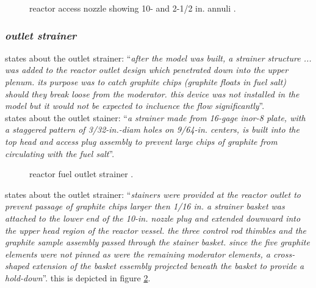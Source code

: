 \documentclass[ms,a4paper]{memoir}
\newcommand*{\mrsarchive}{../../msr-archive}%
\begin{document}
\begin{figure}[H]
  \centering
  \centering
  \caption{reactor access nozzle showing 10- and 2-1/2 in. annuli  \parencite[figure 5.10]{ornl-tm-3229}.}
  \label{3039-fig5-10}
\end{figure}

\subsubsection{\emph{outlet strainer}}
\textcite[page 24-26]{ornl-tm-3229} states about the outlet strainer:
\enquote{\textit{after the model was built, a strainer structure ... was added to the reactor outlet design which penetrated down into the upper plenum. its purpose was to catch graphite chips (graphite floats in fuel salt) should they break loose from the moderator. this device was not installed in the model but it would not be expected to incluence the flow significantly}}. \\

\parencite[page 84-85]{ornl-tm-0728} states about the outlet stainer:
\enquote{\textit{a strainer made from 16-gage inor-8 plate, with a staggered pattern of 3/32-in.-diam holes on 9/64-in. centers, is built into the top head and access plug assembly to prevent large chips of graphite from circulating with the fuel salt}}.

\begin{figure}[H]
  \centering
  \centering
  \caption{reactor fuel outlet strainer \parencite[figure 5.11]{ornl-tm-3229}.}
  \label{3039-fig5-11}
\end{figure}

\textcite[page 115]{ornl-tm-3039} states about the outlet strainer:
\enquote{\textit{stainers were provided at the reactor outlet to prevent passage of graphite chips larger then 1/16 in. a strainer basket was attached to the lower end of the 10-in. nozzle plug and extended downward into the upper head region of the reactor vessel. the three control rod thimbles and the graphite sample assembly passed through the stainer basket. since the five graphite elements were not pinned as were the remaining moderator elements, a cross-shaped extension of the basket essembly projected beneath the basket to provide a hold-down}}. this is depicted in figure \ref{3039-fig5-11}. \\
\end{document}
